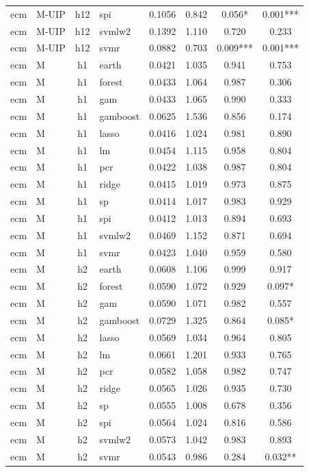 \begin{ThreePartTable}
\begin{longtable}[t]{llclcccc}
ecm & M-UIP & h12 & spi & 0.1056 & 0.842 & 0.056* & 0.001***\\
ecm & M-UIP & h12 & svmlw2 & 0.1392 & 1.110 & 0.720 & 0.233\\
ecm & M-UIP & h12 & svmr & 0.0882 & 0.703 & 0.009*** & 0.001***\\
\addlinespace
ecm & M & h1 & earth & 0.0421 & 1.035 & 0.941 & 0.753\\
ecm & M & h1 & forest & 0.0433 & 1.064 & 0.987 & 0.306\\
ecm & M & h1 & gam & 0.0433 & 1.065 & 0.990 & 0.333\\
ecm & M & h1 & gamboost & 0.0625 & 1.536 & 0.856 & 0.174\\
ecm & M & h1 & lasso & 0.0416 & 1.024 & 0.981 & 0.890\\
ecm & M & h1 & lm & 0.0454 & 1.115 & 0.958 & 0.804\\
ecm & M & h1 & pcr & 0.0422 & 1.038 & 0.987 & 0.804\\
ecm & M & h1 & ridge & 0.0415 & 1.019 & 0.973 & 0.875\\
ecm & M & h1 & sp & 0.0414 & 1.017 & 0.983 & 0.929\\
ecm & M & h1 & spi & 0.0412 & 1.013 & 0.894 & 0.693\\
ecm & M & h1 & svmlw2 & 0.0469 & 1.152 & 0.871 & 0.694\\
ecm & M & h1 & svmr & 0.0423 & 1.040 & 0.959 & 0.580\\
\addlinespace
ecm & M & h2 & earth & 0.0608 & 1.106 & 0.999 & 0.917\\
ecm & M & h2 & forest & 0.0590 & 1.072 & 0.929 & 0.097*\\
ecm & M & h2 & gam & 0.0590 & 1.071 & 0.982 & 0.557\\
ecm & M & h2 & gamboost & 0.0729 & 1.325 & 0.864 & 0.085*\\
ecm & M & h2 & lasso & 0.0569 & 1.034 & 0.964 & 0.805\\
ecm & M & h2 & lm & 0.0661 & 1.201 & 0.933 & 0.765\\
ecm & M & h2 & pcr & 0.0582 & 1.058 & 0.982 & 0.747\\
ecm & M & h2 & ridge & 0.0565 & 1.026 & 0.935 & 0.730\\
ecm & M & h2 & sp & 0.0555 & 1.008 & 0.678 & 0.356\\
ecm & M & h2 & spi & 0.0564 & 1.024 & 0.816 & 0.586\\
ecm & M & h2 & svmlw2 & 0.0573 & 1.042 & 0.983 & 0.893\\
ecm & M & h2 & svmr & 0.0543 & 0.986 & 0.284 & 0.032**\\

\end{longtable}
\end{ThreePartTable}
